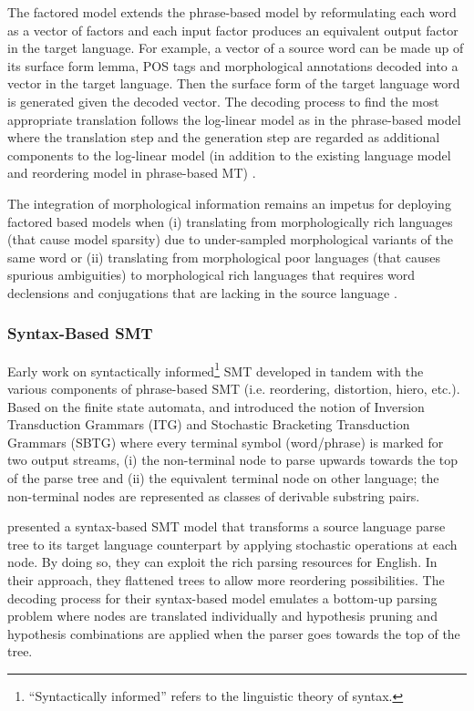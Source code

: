 The factored model extends the phrase-based model by reformulating each word as a vector of factors and each input factor produces an equivalent output factor in the target language. For example, a vector of a source word can be made up of its surface form lemma, POS tags and morphological annotations decoded into a vector in the target language. Then the surface form of the target language word is generated given the decoded vector. The decoding process to find the most appropriate translation follows the log-linear model as in the phrase-based model where the translation step and the generation step are regarded as additional components to the log-linear model (in addition to the existing language model and reordering model in phrase-based MT) \citep{koehn2007factored}. 

The integration of morphological information remains an impetus for deploying factored based models when (i) translating from morphologically rich languages (that cause model sparsity) due to under-sampled morphological variants of the same word \citep{bojar2007english} or (ii) translating from morphological poor languages (that causes spurious ambiguities) to morphological rich languages that requires word declensions and conjugations that are lacking in the source language \citep{ramanathan2009case}.


\subsubsection{Syntax-Based SMT}

Early work on syntactically informed\footnote{ ``Syntactically informed'' refers to the linguistic theory of syntax.} SMT developed in tandem with the various components of phrase-based SMT (i.e. reordering, distortion, hiero, etc.). Based on the finite state automata, \cite{wu1997stochastic} and \cite{wu1998machine} introduced the notion of Inversion Transduction Grammars (ITG) and Stochastic Bracketing Transduction Grammars (SBTG) where every terminal symbol (word/phrase) is marked for two output streams, (i) the non-terminal node to parse upwards towards the top of the parse tree and (ii) the equivalent terminal node on other language; the non-terminal nodes are represented as classes of derivable substring pairs. 

\cite{yamada2001syntax} presented a syntax-based SMT model that transforms a source language parse tree to its target language counterpart by applying stochastic operations at each node. By doing so, they can exploit the rich parsing resources for  English. In their approach, they flattened trees to allow more reordering possibilities. The decoding process for their syntax-based model emulates a bottom-up parsing problem where nodes are translated individually and hypothesis pruning and hypothesis combinations are applied when the parser goes towards the top of the tree. 

